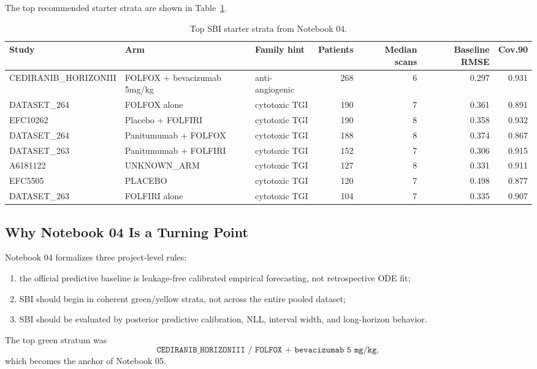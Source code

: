 \documentclass[11pt,a4paper]{article}
\begin{document}
The top recommended starter strata are shown in Table~\ref{tab:n04-readiness}.

\begin{table}[H]
\centering
\small
\caption{Top SBI starter strata from Notebook 04.}
\label{tab:n04-readiness}
\begin{tabular}{p{}p{}p{}rrrr}
\toprule
Study & Arm & Family hint & Patients & Median scans & Baseline RMSE & Cov.90 \\
\midrule
CEDIRANIB\_HORIZONIII & FOLFOX + bevacizumab 5mg/kg & anti-angiogenic & 268 & 6 & 0.297 & 0.931 \\
DATASET\_264 & FOLFOX alone & cytotoxic TGI & 190 & 7 & 0.361 & 0.891 \\
EFC10262 & Placebo + FOLFIRI & cytotoxic TGI & 190 & 8 & 0.358 & 0.932 \\
DATASET\_264 & Panitumumab + FOLFOX & cytotoxic TGI & 188 & 8 & 0.374 & 0.867 \\
DATASET\_263 & Panitumumab + FOLFIRI & cytotoxic TGI & 152 & 7 & 0.306 & 0.915 \\
A6181122 & UNKNOWN\_ARM & cytotoxic TGI & 127 & 8 & 0.331 & 0.911 \\
EFC5505 & PLACEBO & cytotoxic TGI & 120 & 7 & 0.498 & 0.877 \\
DATASET\_263 & FOLFIRI alone & cytotoxic TGI & 104 & 7 & 0.335 & 0.907 \\
\bottomrule
\end{tabular}
\end{table}

\subsection{Why Notebook 04 Is a Turning Point}

Notebook 04 formalizes three project-level rules:
\begin{enumerate}[leftmargin=2em]
    \item the official predictive baseline is leakage-free calibrated empirical forecasting, not retrospective ODE fit;
    \item SBI should begin in coherent green/yellow strata, not across the entire pooled dataset;
    \item SBI should be evaluated by posterior predictive calibration, NLL, interval width, and long-horizon behavior.
\end{enumerate}

The top green stratum was
\[
    \texttt{CEDIRANIB\_HORIZONIII / FOLFOX + bevacizumab 5 mg/kg},
\]
which becomes the anchor of Notebook 05.
\end{document}

